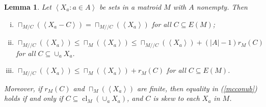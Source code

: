 \documentclass{amsart}
\theoremstyle{plain}
\newtheorem{lemma}[theorem]{Lemma}
\theoremstyle{definition}
\newcommand{\cX}{\mathcal{X}}
\newcommand{\dcon}{/ \!\! /}
\DeclareMathOperator{\cl}{cl}
\newcommand{\con}{/}
\newcommand{\ab}[1]{\left\langle#1\right\rangle}
\renewcommand{\le}{\leqslant}
\renewcommand{\ss}{\subseteq}
\begin{document}
\begin{lemma}\label{mccon}
  Let $\ab{X_a : a \in A}$ be sets in a matroid $M$ with $A$ nonempty. Then 
  \begin{enumerate}[(i)]
    \item\label{mcproj} $\sqcap_{M \con C}(\ab{X_a - C}) = \sqcap_{M \dcon C}(\ab{X_a})$ for all $C \ss E(M)$;
    \item\label{mcconbd} 
      $\sqcap_{M \dcon C}(\ab{X_a}) \le \sqcap_M(\ab{X_a}) \le \sqcap_{M \dcon C}(\ab{X_a}) + (|A| - 1)r_M(C)$ for all $C \ss \cup_a X_a$.
    \item\label{mcconub}
      $\sqcap_{M \dcon C}(\ab{X_a}) \le \sqcap_M(\ab{X_a}) + r_M(C)$ for all $C \ss E(M)$. 
  \end{enumerate}
  Moreover, if $r_M(C)$ and $\sqcap_M(\ab{X_a})$ are finite, 
  then equality in (\ref{mcconub}) holds if and only if $C \ss \cl_M(\cup_a X_a)$, 
  and $C$ is skew to each $X_a$ in $M$. 
\end{lemma}
\end{document}
